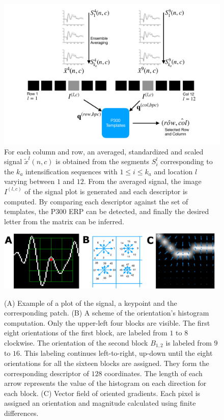 \documentclass[utf8]{frontiersSCNS} %
\begin{document}
\begin{figure}[h!]
\centering
\includegraphics[width=15cm]{classificationgraph.pdf}
\caption{For each column and row, an averaged, standardized and scaled signal $\tilde{x}^l(n,c)$ is obtained from the segments $S_i^l$  corresponding to the $k_a$ intensification sequences with $ 1 \leq i \leq k_a $ and location $l$ varying between $1$ and $12$. From the averaged signal, the image $I^{(l,c)}$ of the signal plot is generated and each descriptor is computed.  By comparing each descriptor against the set of templates, the P300 ERP can be detected, and finally the desired letter from the matrix can be inferred.}
\label{fig:classification}
\end{figure}

\begin{figure}[h!]
\centering
\includegraphics[width=16cm]{gradients.png}\label{samplegradients}
\caption{ (A) Example of a plot of the signal, a keypoint and the corresponding patch. (B) A scheme of the orientation's histogram computation.  Only the upper-left four blocks are visible.  The first eight orientations of the first block, are labeled from $1$ to $8$ clockwise. The orientation of the second block $ B_{1,2} $ is labeled from $9$ to $16$.  This labeling continues left-to-right, up-down until the eight orientations for all the sixteen blocks are assigned. They form the corresponding descriptor of $128$ coordinates.  The length of each arrow represents the value of the histogram on each direction for each block. (C) Vector field of oriented gradients.  Each pixel is assigned an orientation and magnitude calculated  using finite differences. }
\label{fig:sampledescriptor}
\end{figure}
\end{document}
